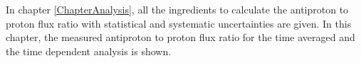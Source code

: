  \label{ChapterResult}

In chapter \ref{ChapterAnalysis}, all the ingredients to calculate the antiproton to proton flux ratio with statistical and systematic uncertainties are given. In this chapter, the measured antiproton to proton flux ratio for the time averaged and the time dependent analysis is shown.




